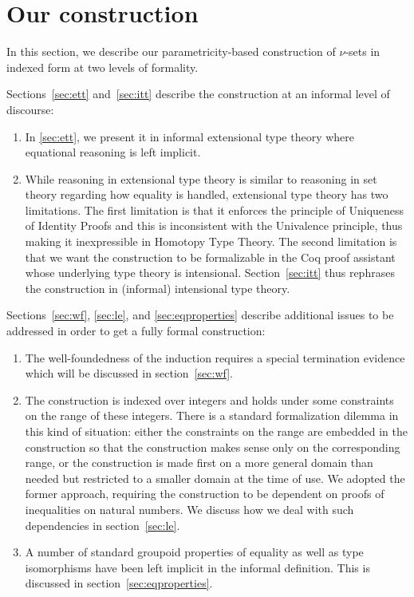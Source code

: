 \documentclass{msc}
\begin{document}
\section{Our construction}
In this section, we describe our parametricity-based construction of $\nu$-sets in indexed form at two levels of formality.

Sections~\ref{sec:ett} and~\ref{sec:itt} describe the construction at an informal level of discourse:
\begin{enumerate}
  \item In \ref{sec:ett}, we present it in informal extensional type theory where equational reasoning is left implicit.
  \item While reasoning in extensional type theory is similar to reasoning in set theory regarding how equality is handled, extensional type theory has two limitations. The first limitation is that it enforces the principle of Uniqueness of Identity Proofs and this is inconsistent with the Univalence principle, thus making it inexpressible in Homotopy Type Theory. The second limitation is that we want the construction to be formalizable in the Coq proof assistant whose underlying type theory is intensional. Section~\ref{sec:itt} thus rephrases the construction in (informal) intensional type theory.
\end{enumerate}

Sections~\ref{sec:wf}, \ref{sec:le}, and \ref{sec:eqproperties} describe additional issues to be addressed in order to get a fully formal construction:
\begin{enumerate}
  \item The well-foundedness of the induction requires a special termination evidence which will be discussed in section~\ref{sec:wf}.
  \item The construction is indexed over integers and holds under some constraints on the range of these integers. There is a standard formalization dilemma in this kind of situation: either the constraints on the range are embedded in the construction so that the construction makes sense only on the corresponding range, or the construction is made first on a more general domain than needed but restricted to a smaller domain at the time of use. We adopted the former approach, requiring the construction to be dependent on proofs of inequalities on natural numbers. We discuss how we deal with such dependencies in section~\ref{sec:le}.
  \item A number of standard groupoid properties of equality as well as type isomorphisms have been left implicit in the informal definition. This is discussed in section~\ref{sec:eqproperties}.
\end{enumerate}
\end{document}
